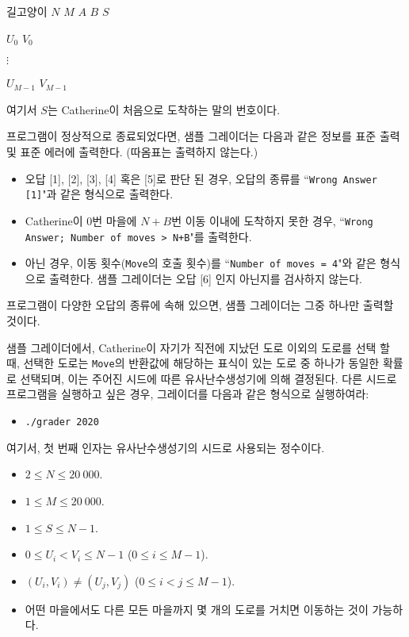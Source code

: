\begin{problem}{길고양이}
	$N$ $M$ $A$ $B$ $S$
	
	$U_0$ $V_0$ 
	
	$\vdots$
	
	$U_{M-1}$ $V_{M-1}$
	
	여기서 $S$는 Catherine이 처음으로 도착하는 말의 번호이다.
		
	\OutputFile
	
	프로그램이 정상적으로 종료되었다면, 샘플 그레이더는 다음과 같은 정보를 표준 출력 및 표준 에러에 출력한다. (따옴표는 출력하지 않는다.)
	
	\begin{itemize}
		\item 오답 [1], [2], [3], [4] 혹은 [5]로 판단 된 경우, 오답의 종류를 ``\texttt{Wrong Answer [1]}"과 같은 형식으로 출력한다.
		\item Catherine이 $0$번 마을에 $N+B$번 이동 이내에 도착하지 못한 경우, ``\texttt{Wrong Answer; Number of moves > N+B}"를 출력한다.
		\item 아닌 경우, 이동 횟수(\texttt{Move}의 호출 횟수)를 ``\texttt{Number of moves = 4}"와 같은 형식으로 출력한다. 샘플 그레이더는 오답 [6] 인지 아닌지를 검사하지 않는다.
	\end{itemize}
	
	프로그램이 다양한 오답의 종류에 속해 있으면, 샘플 그레이더는 그중 하나만 출력할 것이다.
	
	샘플 그레이더에서, Catherine이 자기가 직전에 지났던 도로 이외의 도로를 선택 할 때, 선택한 도로는  \texttt{Move}의 반환값에 해당하는 표식이 있는 도로 중 하나가 동일한 확률로 선택되며, 이는 주어진 시드에 따른 유사난수생성기에 의해 결정된다. 다른 시드로 프로그램을 실행하고 싶은 경우, 그레이더를 다음과 같은 형식으로 실행하여라:
	
	\begin{itemize}
		\item[] \texttt{./grader 2020}
	\end{itemize}

	여기서, 첫 번째 인자는 유사난수생성기의 시드로 사용되는 정수이다.
	
	\Constraints
	
	\begin{itemize}
		\item $2 \le N \le 20\ 000$.
		\item $1 \le M \le 20\ 000$.
		\item $1 \le S \le N-1$.
		\item $0 \le U_i < V_i \le N-1$ ($0 \le i \le M-1$).
		\item $(U_i, V_i) \ne (U_j, V_j)$ ($0 \le i < j \le M-1$).
		\item 어떤 마을에서도 다른 모든 마을까지 몇 개의 도로를 거치면 이동하는 것이 가능하다.
	\end{itemize}
	

\end{problem}
